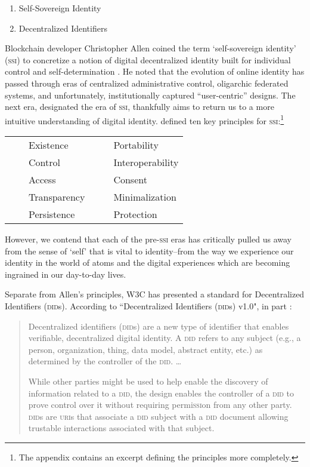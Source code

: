 \documentclass[twoside]{article}
\newcommand{\tabitem}{~~\llap{\textbullet}~~}
\begin{document}
\begin{enumerate}
  \item Self-Sovereign Identity
  \item Decentralized Identifiers
\end{enumerate}

\noindent \sloppy
Blockchain developer Christopher Allen coined the term `self-sovereign identity' (\textsc{ssi}) to concretize a notion of digital decentralized identity built for individual control and self-determination \citep{Allen2016}. He noted that the evolution of online identity has passed through eras of centralized administrative control, oligarchic federated systems, and unfortunately, institutionally captured ``user-centric'' designs. The next era, designated the era of \textsc{ssi}, thankfully aims to return us to a more intuitive understanding of digital identity. \citeauthor{Allen2016} defined ten key principles for \textsc{ssi}:\footnote{The appendix contains an excerpt defining the principles more completely.}

\begin{tabular}{ll}
  \tabitem  Existence
  &
  \tabitem  Portability \\
  \tabitem  Control
  &
  \tabitem  Interoperability \\
  \tabitem  Access
  &
  \tabitem  Consent \\
  \tabitem  Transparency
  &
  \tabitem  Minimalization \\
  \tabitem  Persistence
  &
  \tabitem  Protection \\
\end{tabular}

However, we contend that each of the pre-\textsc{ssi} eras has critically pulled us away from the sense of `self' that is vital to identity–from the way we experience our identity in the world of atoms and the digital experiences which are becoming ingrained in our day-to-day lives.

Separate from Allen's principles, W3C has presented a standard for Decentralized Identifiers (\textsc{did}s). According to ``Decentralized Identifiers (\textsc{did}s) v1.0", in part \citep{W3C2022}:

\begin{quote}
Decentralized identifiers (\textsc{did}s) are a new type of identifier that enables verifiable, decentralized digital identity. A \textsc{did} refers to any subject (e.g., a person, organization, thing, data model, abstract entity, etc.) as determined by the controller of the \textsc{did}.  \ldots{}

While other parties might be used to help enable the discovery of information related to a \textsc{did}, the design enables the controller of a \textsc{did} to prove control over it without requiring permi\textsc{ssi}on from any other party. \textsc{did}s are \textsc{uri}s that associate a \textsc{did} subject with a \textsc{did} document allowing trustable interactions associated with that subject.
\end{quote}
\end{document}
